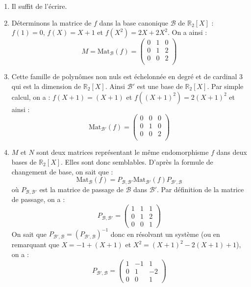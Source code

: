 \documentclass[a4paper,twoside,french,11pt]{VcCours}
\begin{document}
\begin{Exercice}{}\end{Exercice} 
\begin{enumerate}
\item Il suffit de l'écrire. 
\item Déterminons la matrice de $f$ dans la base canonique $\mathcal{B}$ de $\mathbb{R}_2[X]$ : $f(1) =0$, $f(X) = X+1$ et $f(X^2) = 2X+2X^2$. On a ainsi :
$$ M= \textrm{Mat}_{\mathcal{B}}(f) =\begin{pmatrix}
0 & 1 & 0 \\
0 & 1 & 2 \\
0 & 0 & 2 \\
\end{pmatrix}$$

\item Cette famille de polynômes non nuls est échelonnée en degré et de cardinal $3$ qui est la dimension de $\mathbb{R}_2[X]$. Ainsi $\mathcal{B}'$ est une base de $\mathbb{R}_2[X]$. Par simple calcul, on a : $f(X+1)=(X+1)$ et $f((X+1)^2)=2(X+1)^2$ et ainsi :
$$ \textrm{Mat}_{\mathcal{B}'}(f) =\begin{pmatrix}
0 & 0 & 0 \\
0 & 1 & 0 \\
0 & 0 & 2 \\
\end{pmatrix}$$
\item $M$ et $N$ sont deux matrices représentant le même endomorphisme $f$ dans deux bases de $\mathbb{R}_2[X]$. Elles sont donc semblables. D'après la formule de changement de base, on sait que :
$$ \textrm{Mat}_{\mathcal{B}}(f) = P_{\mathcal{B}, \mathcal{B}'} \textrm{Mat}_{\mathcal{B}'}(f) P_{\mathcal{B}', \mathcal{B}}$$
où $P_{\mathcal{B}, \mathcal{B}'}$ est la matrice de passage de $\mathcal{B}$ dans $\mathcal{B}'$. Par définition de la matrice de passage, on a :
$$ P_{\mathcal{B}, \mathcal{B}'} = \begin{pmatrix}
1 & 1 & 1 \\
0 & 1 & 2 \\
0 & 0 & 1 
\end{pmatrix}$$
On sait que $P_{\mathcal{B}', \mathcal{B}} = \left(P_{\mathcal{B}', \mathcal{B}} \right)^{-1}$ donc en résolvant un système (ou en remarquant que $X= -1 + (X+1)$ et $X^2 = (X+1)^2 - 2(X+1) + 1$), on a :
$$ P_{\mathcal{B}', \mathcal{B}}  = \begin{pmatrix}
1 & -1 & 1 \\
0 & 1 & -2 \\
0 & 0 & 1 
\end{pmatrix}$$

\end{enumerate}
\end{document}
